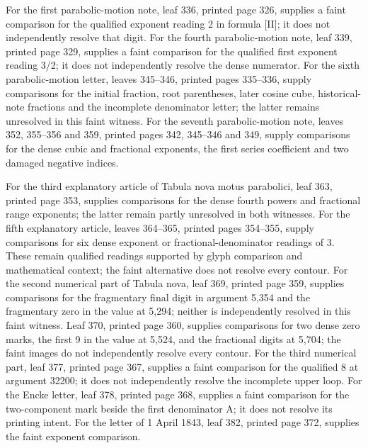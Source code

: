For the first parabolic-motion note, leaf 336, printed page 326, supplies a faint comparison for the qualified exponent reading 2 in formula [II]; it does not independently resolve that digit. For the fourth parabolic-motion note, leaf 339, printed page 329, supplies a faint comparison for the qualified first exponent reading 3/2; it does not independently resolve the dense numerator. For the sixth parabolic-motion letter, leaves 345–346, printed pages 335–336, supply comparisons for the initial fraction, root parentheses, later cosine cube, historical-note fractions and the incomplete denominator letter; the latter remains unresolved in this faint witness. For the seventh parabolic-motion note, leaves 352, 355–356 and 359, printed pages 342, 345–346 and 349, supply comparisons for the dense cubic and fractional exponents, the first series coefficient and two damaged negative indices.

For the third explanatory article of Tabula nova motus parabolici, leaf 363, printed page 353, supplies comparisons for the dense fourth powers and fractional range exponents; the latter remain partly unresolved in both witnesses. For the fifth explanatory article, leaves 364–365, printed pages 354–355, supply comparisons for six dense exponent or fractional-denominator readings of 3. These remain qualified readings supported by glyph comparison and mathematical context; the faint alternative does not resolve every contour. For the second numerical part of Tabula nova, leaf 369, printed page 359, supplies comparisons for the fragmentary final digit in argument 5,354 and the fragmentary zero in the value at 5,294; neither is independently resolved in this faint witness. Leaf 370, printed page 360, supplies comparisons for two dense zero marks, the first 9 in the value at 5,524, and the fractional digits at 5,704; the faint images do not independently resolve every contour. For the third numerical part, leaf 377, printed page 367, supplies a faint comparison for the qualified 8 at argument 32200; it does not independently resolve the incomplete upper loop. For the Encke letter, leaf 378, printed page 368, supplies a faint comparison for the two-component mark beside the first denominator A; it does not resolve its printing intent. For the letter of 1 April 1843, leaf 382, printed page 372, supplies the faint exponent comparison.

